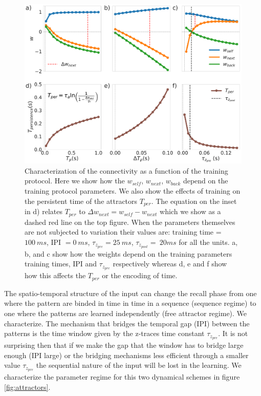 \documentclass[10pt,a4paper]{article}
\begin{document}
\begin{figure}[H]
\centering
\includegraphics[scale=0.20]{training.pdf}
\caption{Characterization of the connectivity as a function of the training protocol. Here we show how the $w_{self}$, $w_{next}$, $w_{back}$ depend on the training protocol parameters. We also show the effects of training on the persistent time of the attractors $T_{per}$. The equation on the inset in d) relates $T_{per}$ to $\Delta w_{next} = w_{self} - w_{next}$ which we show as a dashed red line on the top figure. When the parameters themselves are not subjected to variation their values are: training time = $100 \: ms$, IPI $= 0 \: ms$, $\tau_{z_{pre}}  = 25 \: ms$, $\tau_{z_{post}}= \: 20 ms$ for all the units. a, b, and c show how the weights depend on the training parameters training times, IPI and $\tau_{z_{pre}}$ respectively whereas d, e and f show how this affects the $T_{per}$ or the encoding of time. }
\label{fig:training}
\end{figure}


The spatio-temporal structure of the input can change the recall phase from one where the pattern are binded in time in time in a sequence (sequence regime) to one where the patterns are learned independently (free attractor regime). We characterize. The mechanism that bridges the temporal gap (IPI) between the patterns is the time window given by the z-traces time constant $\tau_{z_{pre}}$. It is not surprising then that if we make the gap that the window has to bridge large enough (IPI large) or the bridging mechanisms less efficient through a smaller value $\tau_{z_{pre}}$ the sequential nature of the input will be lost in the learning. We characterize the parameter regime for this two dynamical schemes in figure \ref{fig:attractors}.  
\end{document}
